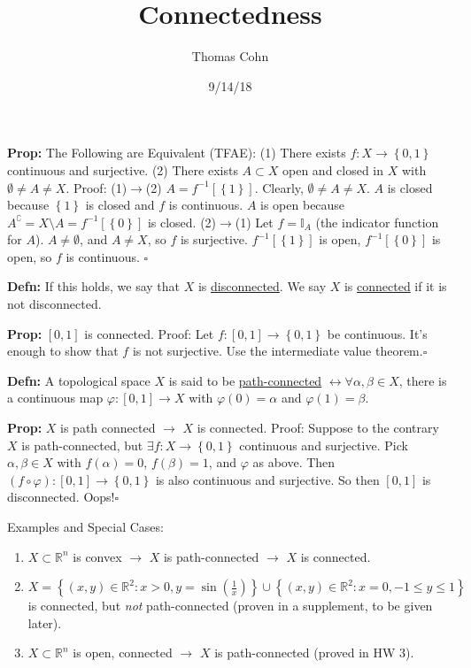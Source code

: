 \documentclass[10pt,letterpaper]{article}
\author{Thomas Cohn}
\title{Connectedness}
\date{9/14/18} %
\newcommand{\n}{\hfill\break}
\newcommand{\defn}[1]{\par\noindent\settowidth{\hangindent}{\textbf{Defn: }}\textbf{Defn: }#1\n}
\newcommand{\prop}[1]{\par\noindent\settowidth{\hangindent}{\textbf{Prop: }}\textbf{Prop: }#1\n}
\newcommand{\proven}{\;$\square$\n}
\newcommand{\set}[1]{\left\{#1\right\}}
\newcommand{\reals}{\mathbb{R}}
\newcommand{\R}{\reals}
\newcommand{\comp}{^{\complement}}
\newcommand{\inv}{^{-1}}
\newcommand{\of}{\circ}
\begin{document}
\maketitle
\setlength\RaggedRightParindent{\parindent}
\RaggedRight

\prop{The Following are Equivalent (TFAE):\n
(1) There exists $f:X\to\set{0,1}$ continuous and surjective.\n
(2) There exists $A\subset{}X$ open and closed in $X$ with $\emptyset\ne{}A\ne{}X$.\n
\n
Proof:\n
(1)${}\to{}$(2) $A=f\inv{}[\set{1}]$. Clearly, $\emptyset\ne{}A\ne{}X$. $A$ is closed because $\set{1}$ is closed and $f$ is continuous. $A$ is open because $A\comp=X\setminus{}A=f\inv{}[\set{0}]$ is closed.\n
(2)${}\to{}$(1) Let $f=\mathbb{I}_{A}$ (the indicator function for $A$). $A\ne\emptyset$, and $A\ne{}X$, so $f$ is surjective. $f\inv{}[\set{1}]$ is open, $f\inv{}[\set{0}]$ is open, so $f$ is continuous.\n
\proven}

\defn{If this holds, we say that $X$ is \underline{disconnected}. We say $X$ is \underline{connected} if it is not disconnected.}

\prop{$[0,1]$ is connected. Proof: Let $f:[0,1]\to\set{0,1}$ be continuous. It's enough to show that $f$ is not surjective. Use the intermediate value theorem.\proven}

\defn{A topological space $X$ is said to be \underline{path-connected} $\leftrightarrow\forall\alpha,\beta\in{}X$, there is a continuous map $\varphi:[0,1]\to{}X$ with $\varphi(0)=\alpha$ and $\varphi(1)=\beta$.}

\prop{$X$ is path connected $\to$ $X$ is connected.\n
Proof: Suppose to the contrary $X$ is path-connected, but $\exists{}f:X\to\set{0,1}$ continuous and surjective. Pick $\alpha,\beta\in{}X$ with $f(\alpha)=0$, $f(\beta)=1$, and $\varphi$ as above. Then $(f\of\varphi):[0,1]\to\set{0,1}$ is also continuous and surjective. So then $[0,1]$ is disconnected. Oops!\proven}

\par\noindent Examples and Special Cases:\n
\begin{enumerate}
	\item $X\subset\R^{n}$ is convex $\to$ $X$ is path-connected $\to$ $X$ is connected.
	\item $X=\set{(x,y)\in\R^{2}:x>0,y=\sin\left(\frac{1}{x}\right)}\cup\set{(x,y)\in\R^{2}:x=0,-1\le{}y\le{}1}$ is connected, but \textit{not} path-connected (proven in a supplement, to be given later).
	\item $X\subset\R^{n}$ is open, connected $\to$ $X$ is path-connected (proved in HW 3).
\end{enumerate}
\end{document}
